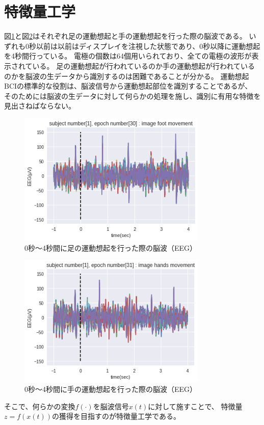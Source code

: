 
\section{特徴量工学}
図\ref{fig:EEGfootmove}と図\ref{fig:EEGhandmove}はそれぞれ足の運動想起と手の運動想起を行った際の脳波である。
いずれも0秒以前は以前はディスプレイを注視した状態であり、0秒以降に運動想起を4秒間行っている。
電極の個数は64個用いられており、全ての電極の波形が表示されている。
足の運動想起が行われているのか手の運動想起が行われているのかを脳波の生データから識別するのは困難であることが分かる。
運動想起BCIの標準的な役割は、脳波信号から運動想起部位を識別することであるが、
そのためには脳波の生データに対して何らかの処理を施し、識別に有用な特徴を見出さねばならない。

\begin{figure}[t]
    \centering
    \includegraphics[width=9cm]{images/EEGfootmove.png}
    \caption{0秒〜4秒間に足の運動想起を行った際の脳波（EEG）}
    \label{fig:EEGfootmove}
\end{figure}
\begin{figure}[t]
    \centering
    \includegraphics[width=9cm]{images/EEGhandmove.png}
    \caption{0秒〜4秒間に手の運動想起を行った際の脳波（EEG）}
    \label{fig:EEGhandmove}
\end{figure}
そこで、何らかの変換\(f(\cdot)\)を脳波信号\(x(t)\)に対して施すことで、
特徴量\(z=f(x(t))\)の獲得を目指すのが特徴量工学である。

